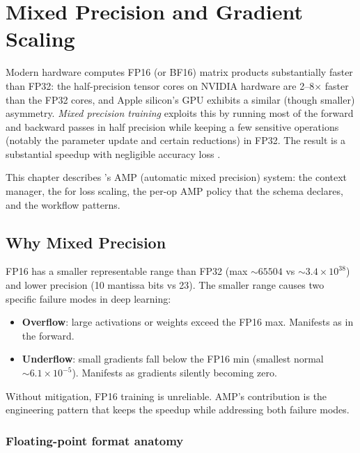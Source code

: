 \chapter{Mixed Precision and Gradient Scaling}
\label{ch:amp}

Modern hardware computes FP16 (or BF16) matrix products
substantially faster than FP32: the half-precision tensor cores
on NVIDIA hardware are 2--8$\times$ faster than the FP32 cores,
and Apple silicon's GPU exhibits a similar (though smaller)
asymmetry. \emph{Mixed precision training} exploits this by
running most of the forward and backward passes in half precision
while keeping a few sensitive operations (notably the parameter
update and certain reductions) in FP32. The result is a
substantial speedup with negligible accuracy loss
\cite{micikevicius_mixed_2018}.

This chapter describes \Lucid's AMP (automatic mixed precision)
system: the  context manager, the
 for loss scaling, the per-op AMP policy that
the schema declares, and the workflow patterns.

\section{Why Mixed Precision}
\label{sec:amp:why}

FP16 has a smaller representable range than FP32 (max $\sim 65504$
vs $\sim 3.4 \times 10^{38}$) and lower precision (10 mantissa
bits vs 23). The smaller range causes two specific failure modes
in deep learning:

\begin{itemize}
  \item \textbf{Overflow}: large activations or weights exceed the
    FP16 max. Manifests as  in the forward.
  \item \textbf{Underflow}: small gradients fall below the FP16
    min (smallest normal $\sim 6.1 \times 10^{-5}$). Manifests
    as gradients silently becoming zero.
\end{itemize}

Without mitigation, FP16 training is unreliable. AMP's
contribution is the engineering pattern that keeps the speedup
while addressing both failure modes.

\subsection{Floating-point format anatomy}
\label{ssec:amp:fp_anatomy}

